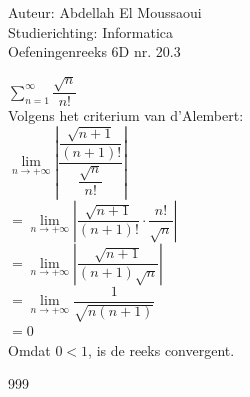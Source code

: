 \documentclass[a4paper]{article}
\begin{document}
  
\noindent \large Auteur: Abdellah El Moussaoui \\
\noindent \large Studierichting: Informatica\\
\noindent \large Oefeningenreeks 6D nr. 20.3\\

\medskip

\normalsize


$\displaystyle\sum_{n=1}^{\infty}\dfrac{\sqrt{n}}{n!}$\\

Volgens het criterium van d'Alembert:\\

$\lim\limits_{n\to+\infty} \left| \dfrac{\dfrac{\sqrt{n+1}}{\left(n+1\right)!}}{\dfrac{\sqrt{n}}{n!}} \right|$ \\

$= \lim\limits_{n\to+\infty} \left| \dfrac{\sqrt{n+1}}{\left(n+1\right)!} \cdot \dfrac{n!}{\sqrt{n}}\right|$ \\

$= \lim\limits_{n\to+\infty} \left| \dfrac{\sqrt{n+1}}{\left(n+1\right)\sqrt{n}}\right|$\\

$= \lim\limits_{n\to+\infty}\dfrac{1}{\sqrt{n\left(n+1\right)}}$\\

$=0$\\

Omdat $0<1$, is de reeks convergent.\\


\begin{thebibliography}{999}
\end{thebibliography}
\end{document}
